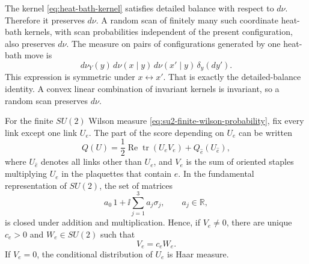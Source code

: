 The kernel \eqref{eq:heat-bath-kernel} satisfies detailed balance with
respect to \(d\nu\).  Therefore it preserves \(d\nu\).  A random scan of
finitely many such coordinate heat-bath kernels, with scan probabilities
independent of the present configuration, also preserves \(d\nu\).
The measure on pairs of configurations generated by one heat-bath move is
\begin{equation}
  d\nu_Y(y)\,d\nu(x\mid y)\,d\nu(x'\mid y)\,\delta_y(dy').
  \label{eq:heat-bath-pair-measure}
\end{equation}
This expression is symmetric under \(x\leftrightarrow x'\).  That is exactly
the detailed-balance identity.  A convex linear combination of invariant
kernels is invariant, so a random scan preserves \(d\nu\).

For the finite \(SU(2)\) Wilson measure \eqref{eq:su2-finite-wilson-probability},
fix every link except one link \(U_e\).  The part of the score depending on
\(U_e\) can be written
\begin{equation}
  Q(U)
  =
  \frac12\operatorname{Re}\operatorname{tr}(U_e V_e)
  + Q_{\widehat e}(U_{\widehat e}),
  \label{eq:su2-local-staple-score}
\end{equation}
where \(U_{\widehat e}\) denotes all links other than \(U_e\), and \(V_e\) is
the sum of oriented staples multiplying \(U_e\) in the plaquettes that
contain \(e\).  In the fundamental representation of \(SU(2)\), the set of
matrices
\[
  a_0\,1+\ii\sum_{j=1}^3 a_j\sigma_j,
  \qquad a_j\in\mathbb R,
\]
is closed under addition and multiplication.  Hence, if \(V_e\neq0\), there
are unique \(c_e>0\) and \(W_e\in SU(2)\) such that
\begin{equation}
  V_e=c_e W_e .
  \label{eq:su2-staple-polar-form}
\end{equation}
If \(V_e=0\), the conditional distribution of \(U_e\) is Haar measure.

